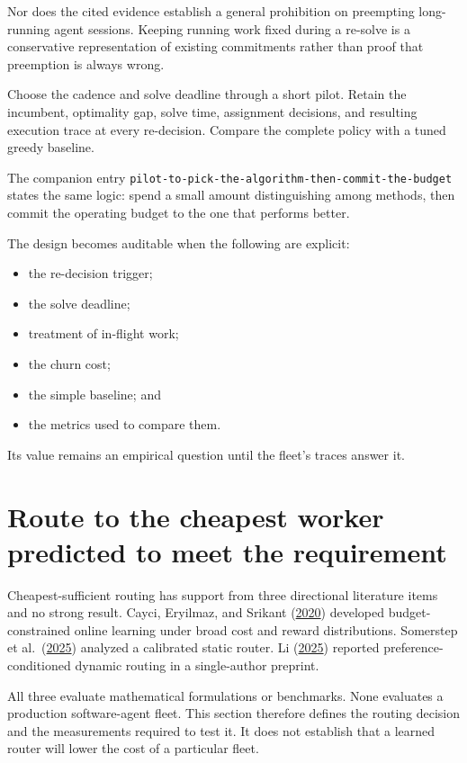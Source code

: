Nor does the cited evidence establish a general prohibition on preempting long-running agent sessions. Keeping running work fixed during a re-solve is a conservative representation of existing commitments rather than proof that preemption is always wrong.

Choose the cadence and solve deadline through a short pilot. Retain the incumbent, optimality gap, solve time, assignment decisions, and resulting execution trace at every re-decision. Compare the complete policy with a tuned greedy baseline.

The companion entry \texttt{pilot-to-pick-the-algorithm-then-commit-the-budget} states the same logic: spend a small amount distinguishing among methods, then commit the operating budget to the one that performs better.

The design becomes auditable when the following are explicit:

\begin{itemize}
\tightlist
\item
  the re-decision trigger;
\item
  the solve deadline;
\item
  treatment of in-flight work;
\item
  the churn cost;
\item
  the simple baseline; and
\item
  the metrics used to compare them.
\end{itemize}

Its value remains an empirical question until the fleet's traces answer it.

\section{Route to the cheapest worker predicted to meet the requirement}\label{route-to-the-cheapest-worker-predicted-to-meet-the-requirement}

Cheapest-sufficient routing has support from three directional literature items and no strong result. Cayci, Eryilmaz, and Srikant (\href{https://arxiv.org/abs/2003.00365}{2020}) developed budget-constrained online learning under broad cost and reward distributions. Somerstep et al.~(\href{https://arxiv.org/abs/2502.03261}{2025}) analyzed a calibrated static router. Li (\href{https://arxiv.org/abs/2502.02743}{2025}) reported preference-conditioned dynamic routing in a single-author preprint.

All three evaluate mathematical formulations or benchmarks. None evaluates a production software-agent fleet. This section therefore defines the routing decision and the measurements required to test it. It does not establish that a learned router will lower the cost of a particular fleet.

